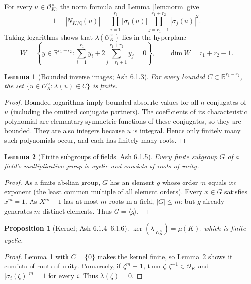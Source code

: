 \documentclass[11pt]{article}
\newtheorem{lemma}{Lemma}
\newtheorem{proposition}{Proposition}
\newcommand{\OK}{\mathcal O_K}
\newcommand{\R}{\mathbb R}
\newcommand{\Q}{\mathbb Q}
\newcommand{\Nm}{N_{K/\Q}}
\begin{document}
For every $u\in\OK^\times$, the norm formula and Lemma~\ref{lem:norm} give
\[
1=|\Nm(u)|=\prod_{i=1}^{r_1}|\sigma_i(u)|
\prod_{j=r_1+1}^{r_1+r_2}|\sigma_j(u)|^2.
\]
Taking logarithms shows that $\lambda(\OK^\times)$ lies in the hyperplane
\begin{equation}\label{eq:W}
W=\left\{y\in\R^{r_1+r_2}:
\sum_{i=1}^{r_1}y_i+2\sum_{j=r_1+1}^{r_1+r_2}y_j=0\right\},
\qquad \dim W=r_1+r_2-1.
\end{equation}

\begin{lemma}[Bounded inverse images; Ash 6.1.3]\label{lem:finite}
For every bounded $C\subset\R^{r_1+r_2}$, the set
$\{u\in\OK^\times:\lambda(u)\in C\}$ is finite.
\end{lemma}
\begin{proof}
Bounded logarithms imply bounded absolute values for all $n$ conjugates of $u$ (including the omitted conjugate partners). The coefficients of its characteristic polynomial are elementary symmetric functions of these conjugates, so they are bounded. They are also integers because $u$ is integral. Hence only finitely many such polynomials occur, and each has finitely many roots.
\end{proof}

\begin{lemma}[Finite subgroups of fields; Ash 6.1.5]\label{lem:cyclic}
Every finite subgroup $G$ of a field's multiplicative group is cyclic and consists of roots of unity.
\end{lemma}
\begin{proof}
As a finite abelian group, $G$ has an element $g$ whose order $m$ equals its exponent (the least common multiple of all element orders). Every $x\in G$ satisfies $x^m=1$. As $X^m-1$ has at most $m$ roots in a field, $|G|\le m$; but $g$ already generates $m$ distinct elements. Thus $G=\langle g\rangle$.
\end{proof}

\begin{proposition}[Kernel; Ash 6.1.4--6.1.6]\label{prop:kernel}
$\ker(\lambda|_{\OK^\times})=\mu(K)$, which is finite cyclic.
\end{proposition}
\begin{proof}
Lemma~\ref{lem:finite} with $C=\{0\}$ makes the kernel finite, so Lemma~\ref{lem:cyclic} shows it consists of roots of unity. Conversely, if $\zeta^m=1$, then $\zeta,\zeta^{-1}\in\OK$ and $|\sigma_i(\zeta)|^m=1$ for every $i$. Thus $\lambda(\zeta)=0$.
\end{proof}
\end{document}
